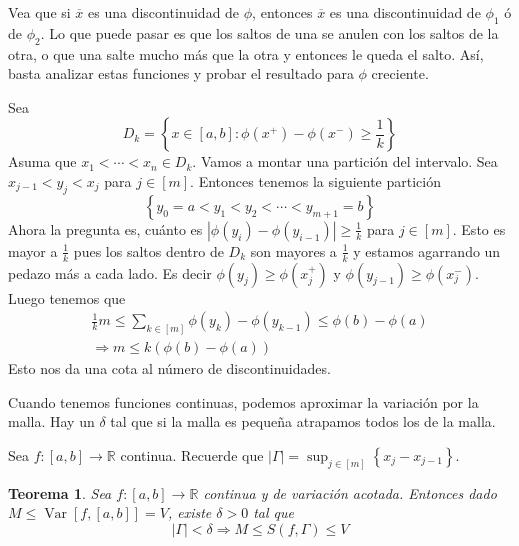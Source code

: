 \documentclass[12pt]{article}
\theoremstyle{plain}
\newtheorem{Th}{Teorema}[subsection]   %
\theoremstyle{definition}
\theoremstyle{remark}
\numberwithin{equation}{section}
\DeclareMathOperator{\Var}{Var}     %
\newcommand{\bR}{\mathbb{R}}        %
\renewcommand{\geq}{\geqslant}      %
\renewcommand{\leq}{\leqslant}      %
\renewcommand{\:}{\colon}           %
\newcommand{\conj}[1]{\left\lbrace#1\right\rbrace}
\newcommand{\bonj}[1]{\left\lbrack#1\right\rbrack}
\begin{document}
\begin{multicols}{2}
\begin{ptcbp}
Vea que si $\overline{x}$ es una discontinuidad de $\phi$, entonces $\overline{x}$ es una discontinuidad de $\phi_1$ ó de $\phi_2$. Lo que puede pasar es que los saltos de una se anulen con los saltos de la otra, o que una salte mucho más que la otra y entonces le queda el salto. Así, basta analizar estas funciones y probar el resultado para $\phi$ creciente. \par
Sea
$$D_k=\conj{x\in\bonj{a,b}\: \phi(x^+)-\phi(x^-)\geq\frac{1}{k}}$$
Asuma que $x_1<\cdots<x_n\in D_k$. Vamos a montar una partición del intervalo. Sea $x_{j-1}<y_j<x_{j}$ para $j\in\bonj{m}$. Entonces tenemos la siguiente partición
$$\conj{y_0=a<y_1<y_2<\cdots<y_{m+1}=b}$$
Ahora la pregunta es, cuánto es $|\phi(y_i)-\phi(y_{i-1})|\geq\frac{1}{k}$ para $j\in\bonj{m}$. Esto es mayor a $\frac{1}{k}$ pues los saltos dentro de $D_k$ son mayores a $\frac{1}{k}$ y estamos agarrando un pedazo más a cada lado. Es decir $\phi(y_j)\geq\phi(x_j^+)$ y $\phi(y_{j-1})\geq\phi(x_j^-)$. Luego tenemos que
\begin{gather*}
  \frac{1}{k}m\leq\sum_{k\in\bonj{m}}\phi(y_k)-\phi(y_{k-1})\leq\phi(b)-\phi(a) \\
  \Rightarrow m\leq k(\phi(b)-\phi(a))
\end{gather*}
Esto nos da una cota al número de discontinuidades.
\end{ptcbp}

Cuando tenemos funciones continuas, podemos aproximar la variación por la malla. Hay un $\delta$ tal que si la malla es pequeña atrapamos todos los de la malla.\par
Sea $f\:\bonj{a,b}\to\bR$ continua. Recuerde que $|\Gamma|=\sup_{j\in\bonj{m}}\conj{x_j-x_{j-1}}$.
\begin{Th}
Sea $f\:\bonj{a,b}\to\bR$ continua y de variación acotada. Entonces dado $M\leq\Var\bonj{f,\bonj{a,b}}=V$, existe $\delta>0$ tal que $$|\Gamma|<\delta\Rightarrow M\leq S(f,\Gamma)\leq V$$
\end{Th}


\end{multicols}
\end{document}
